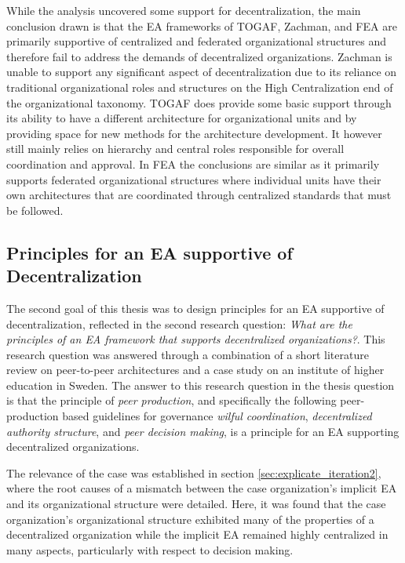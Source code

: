 While the analysis uncovered some support for decentralization, the main conclusion drawn is that the EA frameworks of TOGAF, Zachman, and FEA are primarily supportive of centralized and federated organizational structures and therefore fail to address the demands of decentralized organizations. Zachman is unable to support any significant aspect of decentralization due to its reliance on traditional organizational roles and structures on the High Centralization end of the organizational taxonomy. TOGAF does provide some basic support through its ability to have a different architecture for organizational units and by providing space for new methods for the architecture development. It however still mainly relies on hierarchy and central roles responsible for overall coordination and approval. In FEA the conclusions are similar as it primarily supports federated organizational structures where individual units have their own architectures that are coordinated through centralized standards that must be followed.


\subsection{Principles for an EA supportive of Decentralization}

The second goal of this thesis was to design principles for an EA supportive of decentralization, reflected in the second research question: \textit{What are the principles of an EA framework that supports decentralized organizations?}.  This research question was answered through a combination of a short literature review on peer-to-peer architectures and a case study on an institute of higher education in Sweden. The answer to this research question in the thesis question is that the principle of \textit{peer production}, and specifically the following peer-production based guidelines for governance \textit{wilful coordination}, \textit{decentralized authority structure}, and \textit{peer decision making}, is a principle for an EA supporting decentralized organizations. 

The relevance of the case was established in section \ref{sec:explicate_iteration2}, where the root causes of a mismatch between the case organization's implicit EA and its organizational structure were detailed. Here, it was found that the case organization's organizational structure exhibited many of the properties of a decentralized organization while the implicit EA remained highly centralized in many aspects, particularly with respect to decision making. 


